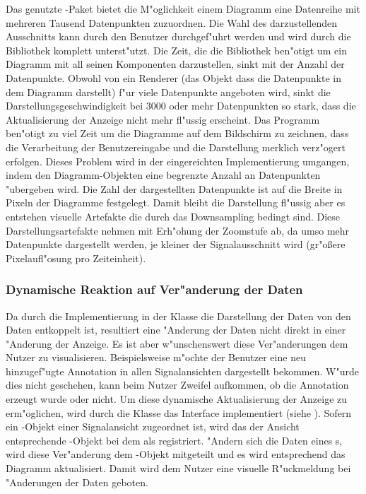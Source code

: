 Das genutzte \jfcNS-Paket bietet die M"oglichkeit einem Diagramm eine Datenreihe mit mehreren Tausend Datenpunkten zuzuordnen.
Die Wahl des darzustellenden Ausschnitts kann durch den Benutzer durchgef"uhrt werden und wird durch die Bibliothek komplett unterst"utzt.
Die Zeit, die die Bibliothek ben"otigt um ein Diagramm mit all seinen Komponenten darzustellen, sinkt mit der Anzahl der Datenpunkte.
Obwohl von \jfc ein Renderer (das Objekt dass die Datenpunkte in dem Diagramm darstellt) f"ur viele Datenpunkte angeboten wird, sinkt die Darstellungsgeschwindigkeit bei \unit{3000} oder mehr Datenpunkten so stark, dass die Aktualisierung der Anzeige nicht mehr fl"ussig erscheint.
Das Programm ben"otigt zu viel Zeit um die Diagramme auf dem Bildschirm zu zeichnen, dass die Verarbeitung der Benutzereingabe und die Darstellung merklich verz"ogert erfolgen.
Dieses Problem wird in der eingereichten Implementierung umgangen, indem den Diagramm-Objekten eine begrenzte Anzahl an Datenpunkten "ubergeben wird.
Die Zahl der dargestellten Datenpunkte ist auf die Breite in Pixeln der Diagramme festgelegt.
Damit bleibt die Darstellung fl"ussig aber es entstehen visuelle Artefakte die durch das Downsampling bedingt sind.
Diese Darstellungsartefakte nehmen mit Erh"ohung der Zoomstufe ab, da umso mehr Datenpunkte dargestellt werden, je kleiner der Signalausschnitt wird (gr"o{\ss}ere Pixelaufl"osung pro Zeiteinheit).


\subsubsection{Dynamische Reaktion auf Ver"anderung der Daten}
\label{sec:dynamic_reaction}

Da durch die Implementierung in der Klasse  die Darstellung der Daten von den Daten entkoppelt ist, resultiert eine "Anderung der Daten nicht direkt in einer "Anderung der Anzeige.
Es ist aber w"unschenswert diese Ver"anderungen dem Nutzer zu visualisieren.
Beispielsweise m"ochte der Benutzer eine neu hinzugef"ugte Annotation in allen Signalansichten dargestellt bekommen.
W"urde dies nicht geschehen, kann beim Nutzer Zweifel aufkommen, ob die Annotation erzeugt wurde oder nicht.
Um diese dynamische Aktualisierung der Anzeige zu erm"oglichen, wird durch die Klasse  das Interface  implementiert (siehe ).
Sofern ein -Objekt einer Signalansicht zugeordnet ist, wird das der Ansicht entsprechende -Objekt bei dem  als  registriert.
"Andern sich die Daten eines s, wird diese Ver"anderung dem -Objekt mitgeteilt und es wird entsprechend das Diagramm aktualisiert.
Damit wird dem Nutzer eine visuelle R"uckmeldung bei "Anderungen der Daten geboten.

